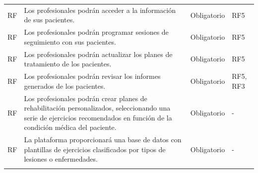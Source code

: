 \documentclass{article}
\begin{document}
\begin{longtable}{@{} p{2.5cm} p{6.5cm} p{3cm} p{3cm} @{}}
	\addlinespace \stepcounter{requisitosFuncionales}
	RF\therequisitosFuncionales & Los profesionales podrán acceder a la información de sus pacientes. & Obligatorio & RF5 \\ 
	\addlinespace \stepcounter{requisitosFuncionales}
	RF\therequisitosFuncionales & Los profesionales podrán programar sesiones de seguimiento con sus pacientes. & Obligatorio & RF5 \\ 
	\addlinespace \stepcounter{requisitosFuncionales}
	RF\therequisitosFuncionales & Los profesionales podrán actualizar los planes de tratamiento de los pacientes. & Obligatorio & RF5 \\ 
	\addlinespace \stepcounter{requisitosFuncionales}
	RF\therequisitosFuncionales & Los profesionales podrán revisar los informes generados de los pacientes. & Obligatorio & RF5, RF3\\ 
	\addlinespace \stepcounter{requisitosFuncionales}
	 

	RF\therequisitosFuncionales & Los profesionales podrán crear planes de rehabilitación personalizados, seleccionando una serie de ejercicios recomendados en función de la condición médica del paciente. & Obligatorio & - \\ 
	\addlinespace \stepcounter{requisitosFuncionales}

	RF\therequisitosFuncionales & La plataforma proporcionará una base de datos con plantillas de ejercicios clasificados por tipos de lesiones o enfermedades. & Obligatorio & - \\ 
	\addlinespace \stepcounter{requisitosFuncionales}


\end{longtable}
\end{document}
